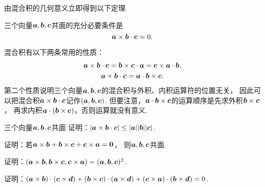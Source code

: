 由混合积的几何意义立即得到以下定理.
\begin{theorem}
三个向量\(\vb{a},\vb{b},\vb{c}\)共面的充分必要条件是\[
	\vb{a}\times\vb{b}\cdot\vb{c} = 0.
\]
\end{theorem}

混合积有以下两条常用的性质：
\begin{gather}
	\vb{a}\times\vb{b}\cdot\vb{c}
	= \vb{b}\times\vb{c}\cdot\vb{a}
	= \vb{c}\times\vb{a}\cdot\vb{b}, \\
	\vb{a}\times\vb{b}\cdot\vb{c}
	= \vb{a}\cdot\vb{b}\times\vb{c}.
\end{gather}
第二个性质说明三个向量\(\vb{a},\vb{b},\vb{c}\)的混合积与外积、内积运算符的位置无关，
因此可以把混合积\(\vb{a}\times\vb{b}\cdot\vb{c}\)记作\((\vb{a},\vb{b},\vb{c})\).
但要注意，\(\vb{a}\cdot\vb{b}\times\vb{c}\)的运算顺序是先求外积\(\vb{b}\times\vb{c}\)，
再求内积\(\vb{a}\cdot(\vb{b}\times\vb{c})\)，否则运算就没有意义.

\begin{example}
三个向量\(\vb{a},\vb{b},\vb{c}\)共面
证明：\(\abs{\vb{a}\times\vb{b}\cdot\vb{c}}
\leq \abs{\vb{a}} \abs{\vb{b}} \abs{\vb{c}}\).
\end{example}

\begin{example}
证明：若\(\vb{a}\times\vb{b}
+ \vb{b}\times\vb{c}
+ \vb{c}\times\vb{a}
= \vb{0}\)，
则\(\vb{a},\vb{b},\vb{c}\)共面.
\end{example}

\begin{example}
证明：\((\vb{a}\times\vb{b},\vb{b}\times\vb{c},\vb{c}\times\vb{a})
= (\vb{a},\vb{b},\vb{c})^2\).
\end{example}

\begin{example}
证明：\((\vb{a}\times\vb{b})\cdot(\vb{c}\times\vb{d})
+ (\vb{b}\times\vb{c})\cdot(\vb{a}\times\vb{d})
+ (\vb{c}\times\vb{a})\cdot(\vb{b}\times\vb{d})
= 0\).
\end{example}

